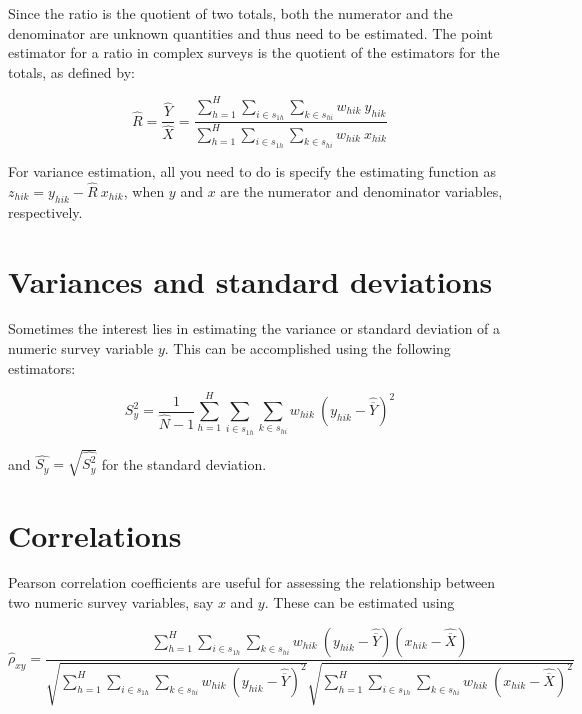 \documentclass[
  12pt,
]{book}
\begin{document}
Since the ratio is the quotient of two totals, both the numerator and the denominator are unknown quantities and thus need to be estimated. The point estimator for a ratio in complex surveys is the quotient of the estimators for the totals, as defined by:

\[
\widehat{R} = \frac{\widehat{Y}}{\widehat{X}}
= \frac{\sum_{h=1}^{H}\sum_{i \in s_{1h}} \sum_{ k \in s_{hi}}  w_{hik} \ y_{hik}}{\sum_{h=1}^{H}\sum_{i \in s_{1h}} \sum_{ k \in s_{hi}}  w_{hik} \ x_{hik}}
\]

For variance estimation, all you need to do is specify the estimating function as \(z_{hik} = y_{hik} - \widehat{R} \ x_{hik}\), when \(y\) and \(x\) are the numerator and denominator variables, respectively.

\hypertarget{variances-and-standard-deviations}{%
\section{Variances and standard deviations}\label{variances-and-standard-deviations}}

Sometimes the interest lies in estimating the variance or standard deviation of a numeric survey variable \(y\). This can be accomplished using the following estimators:

\[
\widehat{S_y^2} = \frac{1}{\widehat{N}-1}
{\sum_{h=1}^{H}\sum_{i \in s_{1h}} \sum_{ k \in s_{hi}}  w_{hik} \ \left( y_{hik} - \widehat{\overline{Y}} \right)^2}
\]

and \(\widehat{S_y} = \sqrt{\widehat{S_y^2}}\) for the standard deviation.

\hypertarget{correlations}{%
\section{Correlations}\label{correlations}}

Pearson correlation coefficients are useful for assessing the relationship between two numeric survey variables, say \(x\) and \(y\). These can be estimated using

\[
\widehat{\rho}_{xy} = \frac {\sum_{h=1}^{H}\sum_{i \in s_{1h}} \sum_{ k \in s_{hi}}  w_{hik} \ \left( y_{hik} - \widehat{\overline{Y}} \right) \left( x_{hik} - \widehat{\overline{X}} \right)} {\sqrt{\sum_{h=1}^{H}\sum_{i \in s_{1h}} \sum_{ k \in s_{hi}}  w_{hik} \ \left( y_{hik} - \widehat{\overline{Y}} \right)^2} \sqrt{\sum_{h=1}^{H}\sum_{i \in s_{1h}} \sum_{ k \in s_{hi}}  w_{hik} \ \left( x_{hik} - \widehat{\overline{X}} \right)^2}}
\]
\end{document}
